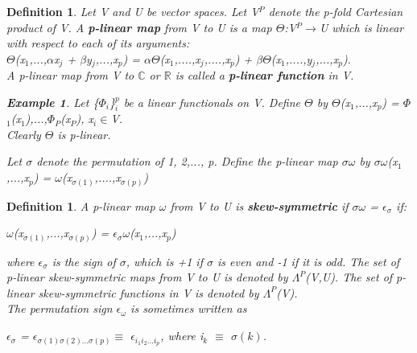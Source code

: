 \documentclass[12pt,a4paper]{article}
\newtheorem{defn}[thm]{Definition}
\newtheorem{exmp}{Example}[section]
\begin{document}
\begin{defn}
Let V and U be vector spaces. Let V$^P$ denote the p-fold Cartesian product of V. A \textbf{p-linear map} from V to U is a map $\Theta$:V$^P$$\to$U which is linear with respect to each of its arguments:\\
$\Theta$(x$_1$,...,$\alpha$x$_j$ + $\beta$y$_j$,...,x$_p$) = $\alpha$$\Theta$(x$_1$,....,x$_j$,....,x$_p$) + $\beta$$\Theta$(x$_1$,....,y$_j$,...,x$_p$).\\
A p-linear map from V to $\mathbb{C}$ or $\mathbb{R}$ is called a \textbf{p-linear function} in V.
\begin{exmp}
Let \{$\Phi$$_i$\}$^{p}_{i}$ be a linear functionals on V. Define $\Theta$ by $\Theta$(x$_1$,...,x$_p$) = $\Phi$$_1$(x$_1$),...,$\Phi$$_P$(x$_P$), x$_i$$\in$V.\\
Clearly $\Theta$ is p-linear.
\end{exmp}
\hspace {1cm} Let $\sigma$ denote the permutation of 1, 2,..., p. Define the p-linear map $\sigma$$\omega$ by $\sigma$$\omega$(x$_1$,...,x$_p$) = $\omega$(x$_{\sigma (1)}$,....,x$_{\sigma (p)}$)\\
\end{defn}
\begin{defn}
A p-linear map $\omega$ from V to U is \textbf{skew-symmetric} if $\sigma\omega$ = $\epsilon_{\sigma}$ if:\begin{center}
$\omega$(x$_{\sigma(1)}$,...,x$_{\sigma(p)}$) = $\epsilon_{\sigma}\omega$(x$_1$,...,x$_p$)\end{center}
where $\epsilon_{\sigma}$ is the sign of $\sigma$, which is +1 if $\sigma$ is even and -1 if it is odd. The set of p-linear skew-symmetric maps from V to U is denoted by $\Lambda^{P}$(V,U). The set of p-linear skew-symmetric functions in V is denoted by $\Lambda^{P}$(V).\\
\hspace{1cm} The permutation sign $\epsilon_{\omega}$ is sometimes written as \begin{center}
$\epsilon_{\sigma}$ = $\epsilon_{\sigma(1)\sigma(2)...\sigma(p)} $$\equiv$ $\epsilon_{i_{1}i_{2}...i_{p}}$, where i$_k$ $\equiv$ $\sigma(k)$.
\end{center}
\end{defn}
\end{document}
